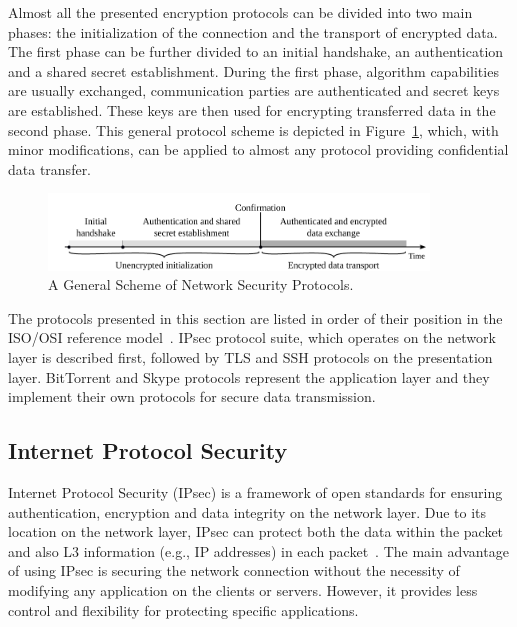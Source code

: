 Almost all the presented encryption protocols can be divided into two main phases: the initialization of the connection and the transport of encrypted data. The first phase can be further divided to an initial handshake, an authentication and a shared secret establishment. During the first phase, algorithm capabilities are usually exchanged, communication parties are authenticated and secret keys are established. These keys are then used for encrypting transferred data in the second phase. This general protocol scheme is depicted in Figure~\ref{fig:protocols-scheme}, which, with minor modifications, can be applied to almost any protocol providing confidential data transfer.

\begin{figure}[!ht]
	\begin{center}
		\includegraphics[width=0.9\textwidth]{figures/protocols_scheme}
		\caption{A General Scheme of Network Security Protocols.}
		\label{fig:protocols-scheme}
	\end{center}
\end{figure}

The protocols presented in this section are listed in order of their position in the ISO/OSI reference model~\cite{ISO7948-1}. IPsec protocol suite, which operates on the network layer is described first, followed by TLS and SSH protocols on the presentation layer. BitTorrent and Skype protocols represent the application layer and they implement their own protocols for secure data transmission.



\subsection{Internet Protocol Security}

Internet Protocol Security (IPsec) is a framework of open standards for ensuring authentication, encryption and data integrity on the network layer. Due to its location on the network layer, IPsec can protect both the data within the packet and also L3 information (e.g., IP addresses) in each packet~\cite{SP-800-77}. The main advantage of using IPsec is securing the network connection without the necessity of modifying any application on the clients or servers. However, it provides less control and flexibility for protecting specific applications.

